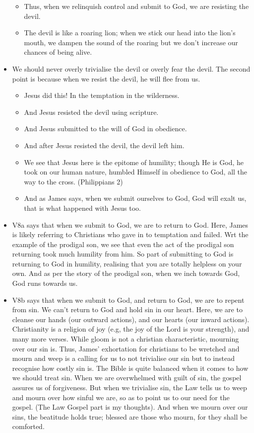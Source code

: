 \begin{itemize}
\begin{itemize}
    \item Thus, when we relinquish control and submit to God, we are resisting the devil. 
    \item The devil is like a roaring lion; when we stick our head into the lion’s mouth, we dampen the sound of the roaring but we don’t increase our chances of being alive.
  \end{itemize}
  \item We should never overly trivialise the devil or overly fear the devil. The second point is because when we resist the devil, he will flee from us.
  \begin{itemize}
    \item Jesus did this! In the temptation in the wilderness.
    \item And Jesus resisted the devil using scripture. 
    \item And Jesus submitted to the will of God in obedience.
    \item And after Jesus resisted the devil, the devil left him.
    \item We see that Jesus here is the epitome of humility; though He is God, he took on our human nature, humbled Himself in obedience to God, all the way to the cross. (Philippians 2)
    \item And as James says, when we submit ourselves to God, God will exalt us, that is what happened with Jesus too.
  \end{itemize}
  \item V8a says that when we submit to God, we are to return to God. Here, James is likely referring to Christians who gave in to temptation and failed. Wrt the example of the prodigal son, we see that even the act of the prodigal son returning took much humility from him. So part of submitting to God is returning to God in humility, realising that you are totally helpless on your own. And as per the story of the prodigal son, when we inch towards God, God runs towards us.
  \item V8b says that when we submit to God, and return to God, we are to repent from sin. We can’t return to God and hold sin in our heart. Here, we are to cleanse our hands (our outward actions), and our hearts (our inward actions). Christianity is a religion of joy (e.g, the joy of the Lord is your strength), and many more verses. While gloom is not a christian characteristic, mourning over our sin is. Thus, James’ exhortation for christians to be wretched and mourn and weep is a calling for us to not trivialise our sin but to instead recognise how costly sin is. The Bible is quite balanced when it comes to how we should treat sin. When we are overwhelmed with guilt of sin, the gospel assures us of forgiveness. But when we trivialise sin, the Law tells us to weep and mourn over how sinful we are, so as to point us to our need for the gospel. (The Law Gospel part is my thoughts). And when we mourn over our sins, the beatitude holds true; blessed are those who mourn, for they shall be comforted.

\end{itemize}
